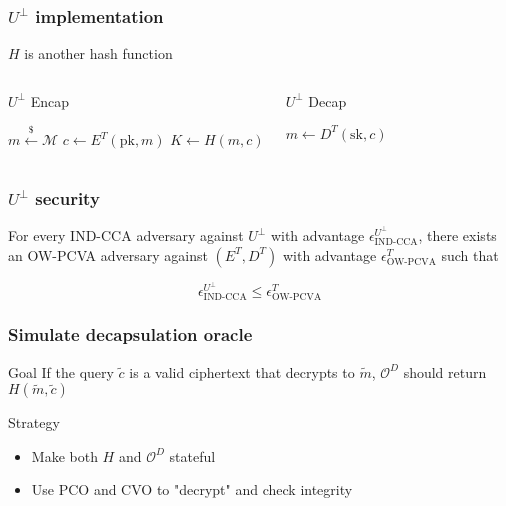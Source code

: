 \documentclass{beamer}
\newcommand{\leftsample}{\overset{{\scriptscriptstyle\$}}{\leftarrow}}
\begin{document}
\begin{frame}
    \frametitle{$U^\bot$ implementation}

    $H$ is another hash function

    \begin{columns}
        \begin{algorithm}[H]
            \SetAlgoLined
            \caption{$U^\bot$ Encap}
            $m \leftsample \mathcal{M}$\;
            $c \leftarrow E^T(\text{pk}, m)$\;
            $K \leftarrow H(m, c)$\;
            \;
        \end{algorithm}

        \begin{algorithm}[H]
            \SetAlgoLined
            \caption{$U^\bot$ Decap}
            $m \leftarrow D^T(\text{sk}, c)$\;
            \;
        \end{algorithm}
    \end{columns}
\end{frame}

\begin{frame}
    \frametitle{$U^\bot$ security}

    For every IND-CCA adversary against $U^\bot$ with advantage $\epsilon^{U^\bot}_\text{IND-CCA}$, there exists an OW-PCVA adversary against $(E^T, D^T)$ with advantage $\epsilon^T_\text{OW-PCVA}$ such that

    $$
    \epsilon^{U^\bot}_\text{IND-CCA} \leq \epsilon^T_\text{OW-PCVA}
    $$

\end{frame}

\begin{frame}
    \frametitle{Simulate decapsulation oracle}

    \begin{block}{Goal}
        If the query $\tilde{c}$ is a valid ciphertext that decrypts to $\tilde{m}$, $\mathcal{O}^D$ should return $H(\tilde{m}, \tilde{c})$
    \end{block}

    \begin{block}{Strategy}
        \begin{itemize}
            \item Make both $H$ and $\mathcal{O}^D$ stateful
            \item Use PCO and CVO to "decrypt" and check integrity
        \end{itemize}    
    \end{block}
\end{frame}
\end{document}
